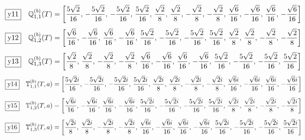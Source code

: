 \documentclass[fleqn,10pt,landscape]{jsarticle}
\begin{document}
\begin{dmath*}
\fbox{y11}\quad \mathbb{Q}_{1,1}^{(b)}(T)=\left[ \frac{5 \sqrt{2}}{16},\, - \frac{5 \sqrt{2}}{16},\, - \frac{5 \sqrt{2}}{16},\, \frac{5 \sqrt{2}}{16},\, \frac{\sqrt{2}}{8},\, \frac{\sqrt{2}}{8},\, - \frac{\sqrt{2}}{8},\, - \frac{\sqrt{2}}{8},\, \frac{\sqrt{6}}{16},\, - \frac{\sqrt{6}}{16},\, \frac{\sqrt{6}}{16},\, - \frac{\sqrt{6}}{16} \right]
\end{dmath*}
\begin{dmath*}
\fbox{y12}\quad \mathbb{Q}_{1,2}^{(b)}(T)=\left[ \frac{\sqrt{6}}{16},\, - \frac{\sqrt{6}}{16},\, \frac{\sqrt{6}}{16},\, - \frac{\sqrt{6}}{16},\, \frac{5 \sqrt{2}}{16},\, - \frac{5 \sqrt{2}}{16},\, - \frac{5 \sqrt{2}}{16},\, \frac{5 \sqrt{2}}{16},\, \frac{\sqrt{2}}{8},\, \frac{\sqrt{2}}{8},\, - \frac{\sqrt{2}}{8},\, - \frac{\sqrt{2}}{8} \right]
\end{dmath*}
\begin{dmath*}
\fbox{y13}\quad \mathbb{Q}_{1,3}^{(b)}(T)=\left[ \frac{\sqrt{2}}{8},\, \frac{\sqrt{2}}{8},\, - \frac{\sqrt{2}}{8},\, - \frac{\sqrt{2}}{8},\, \frac{\sqrt{6}}{16},\, - \frac{\sqrt{6}}{16},\, \frac{\sqrt{6}}{16},\, - \frac{\sqrt{6}}{16},\, \frac{5 \sqrt{2}}{16},\, - \frac{5 \sqrt{2}}{16},\, - \frac{5 \sqrt{2}}{16},\, \frac{5 \sqrt{2}}{16} \right]
\end{dmath*}
\begin{dmath*}
\fbox{y14}\quad \mathbb{T}_{1,1}^{(b)}(T,a)=\left[ \frac{5 \sqrt{2} i}{16},\, - \frac{5 \sqrt{2} i}{16},\, - \frac{5 \sqrt{2} i}{16},\, \frac{5 \sqrt{2} i}{16},\, \frac{\sqrt{2} i}{8},\, \frac{\sqrt{2} i}{8},\, - \frac{\sqrt{2} i}{8},\, - \frac{\sqrt{2} i}{8},\, \frac{\sqrt{6} i}{16},\, - \frac{\sqrt{6} i}{16},\, \frac{\sqrt{6} i}{16},\, - \frac{\sqrt{6} i}{16} \right]
\end{dmath*}
\begin{dmath*}
\fbox{y15}\quad \mathbb{T}_{1,2}^{(b)}(T,a)=\left[ \frac{\sqrt{6} i}{16},\, - \frac{\sqrt{6} i}{16},\, \frac{\sqrt{6} i}{16},\, - \frac{\sqrt{6} i}{16},\, \frac{5 \sqrt{2} i}{16},\, - \frac{5 \sqrt{2} i}{16},\, - \frac{5 \sqrt{2} i}{16},\, \frac{5 \sqrt{2} i}{16},\, \frac{\sqrt{2} i}{8},\, \frac{\sqrt{2} i}{8},\, - \frac{\sqrt{2} i}{8},\, - \frac{\sqrt{2} i}{8} \right]
\end{dmath*}
\begin{dmath*}
\fbox{y16}\quad \mathbb{T}_{1,3}^{(b)}(T,a)=\left[ \frac{\sqrt{2} i}{8},\, \frac{\sqrt{2} i}{8},\, - \frac{\sqrt{2} i}{8},\, - \frac{\sqrt{2} i}{8},\, \frac{\sqrt{6} i}{16},\, - \frac{\sqrt{6} i}{16},\, \frac{\sqrt{6} i}{16},\, - \frac{\sqrt{6} i}{16},\, \frac{5 \sqrt{2} i}{16},\, - \frac{5 \sqrt{2} i}{16},\, - \frac{5 \sqrt{2} i}{16},\, \frac{5 \sqrt{2} i}{16} \right]
\end{dmath*}
\end{document}
